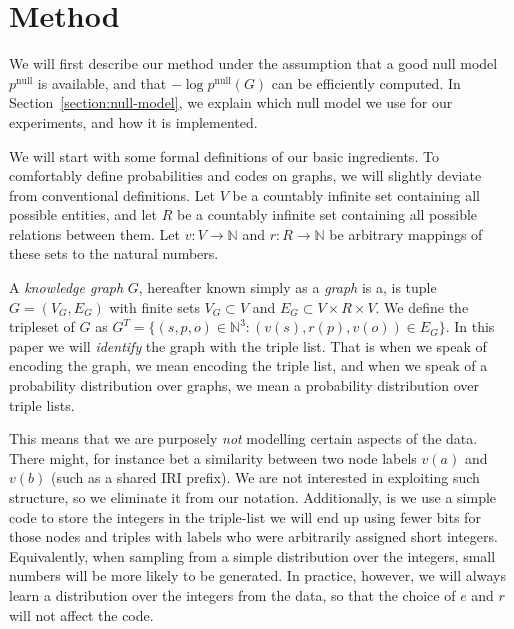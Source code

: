 \documentclass[11pt]{article}
\newcommand{\N}{{\mathbb N}}
\begin{document}
\section{Method}

We will first describe our method under the assumption that a good null model $p^\text{null}$ is available, and that $- \log p^\text{null}(G)$ can be efficiently computed. In Section~\ref{section:null-model}, we explain which null model we use for our experiments, and how it is implemented.

We will start with some formal definitions of our basic ingredients. To comfortably define probabilities and codes on graphs, we will slightly deviate from conventional definitions. Let $V$ be a countably infinite set containing all possible entities, and let $R$ be a countably infinite set containing all possible relations between them. Let $v: V \to \N$ and $r: R \to \N$ be arbitrary mappings of these sets to the natural numbers.\footnotemark


A \emph{knowledge graph} $G$, hereafter known simply as a \emph{graph} is a, is tuple $G = (V_G, E_G)$ with finite sets $V_G \subset V$ and $E_G \subset V \times R \times V$. We define the tripleset of $G$ as $G^T = \{(s, p, o) \in \N^3 : \left (v(s), r(p), v(o) \right ) \in E_G\}$. In this paper we will \emph{identify} the graph with the triple list. That is when we speak of encoding the graph, we mean encoding the triple list, and when we speak of a probability distribution over graphs, we mean a probability distribution over triple lists.

This means that we are purposely \emph{not} modelling certain aspects of the data. There might, for instance bet a similarity between two node labels $v(a)$ and $v(b)$ (such as a shared IRI prefix). We are not interested in exploiting such structure, so we eliminate it from our notation. Additionally, is we use a simple code to store the integers in the triple-list we will end up using fewer bits for those nodes and triples with labels who were arbitrarily assigned short integers. Equivalently, when sampling from a simple distribution over the integers, small numbers will be more likely to be generated. In practice, however, we will always learn a distribution over the integers from the data, so that the choice of $e$ and $r$ will not affect the code. 
\end{document}
